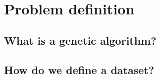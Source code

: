 \section{Problem definition}\label{sec:definition}

\subsection{What is a genetic algorithm?}\label{subsec:genetic_algorithm}

\subsection{How do we define a dataset?}\label{subsec:dataset}
